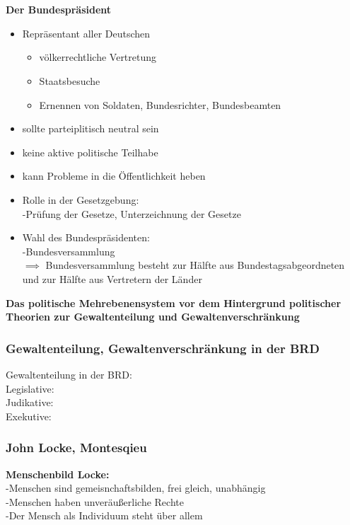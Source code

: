 \documentclass[12pt, letterpaper]{article}
\begin{document}
\begin{itemize}
\begin{itemize}
\end{itemize}
\\\\
\textbf{Der Bundespräsident} 
\begin{itemize}
  \item Repräsentant aller Deutschen
    \begin{itemize}
      \item völkerrechtliche Vertretung
      \item Staatsbesuche
      \item Ernennen von Soldaten, Bundesrichter, Bundesbeamten
    \end{itemize}
  \item sollte parteiplitisch neutral sein
  \item keine aktive politische Teilhabe
  \item kann Probleme in die Öffentlichkeit heben
  \item Rolle in der Gesetzgebung:\\
    -Prüfung der Gesetze, Unterzeichnung der Gesetze
  \item Wahl des Bundespräsidenten: \\
    -Bundesversammlung\\
    $\implies$ Bundesversammlung besteht zur Hälfte aus Bundestagsabgeordneten und zur Hälfte aus Vertretern der Länder\\

\end{itemize}




\newpage
\textbf{Das politische Mehrebenensystem vor dem Hintergrund politischer Theorien zur Gewaltenteilung und Gewaltenverschränkung}
\label{sec:Gewaltenteilung}\\
\subsubsection{Gewaltenteilung, Gewaltenverschränkung in der BRD}
\label{sec:Gewaltenteilung, Gewaltenverschrä}
Gewaltenteilung in der BRD:\\
Legislative:\\
Judikative: \\
Exekutive:\\

\subsubsection{John Locke, Montesqieu}
\label{sec:John Locke, Montesqieu}
\textbf{Menschenbild Locke:} \\
-Menschen sind gemeisnchaftsbilden, frei gleich, unabhängig\\
-Menschen haben unveräußerliche Rechte\\
-Der Mensch als Individuum steht über allem\\\\


\end{itemize}
\end{document}
